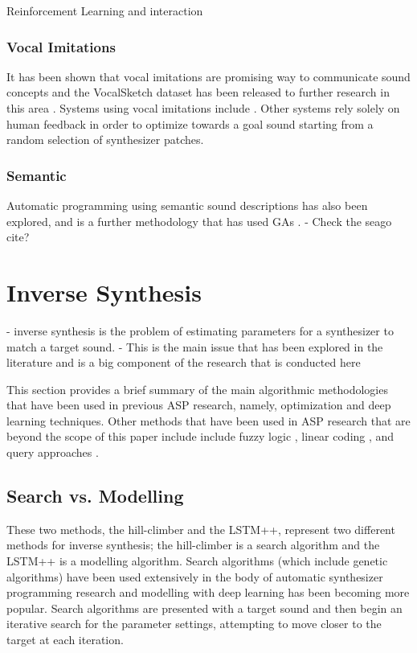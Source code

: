 Reinforcement Learning and interaction \cite{scurto2021designing}

 \subsubsection{Vocal Imitations}
 It has been shown that vocal imitations are promising way to communicate sound concepts \cite{lemaitre2014effectiveness} and the VocalSketch dataset has been released to further research in this area \cite{cartwright2015vocalsketch}. Systems using vocal imitations include \cite{mcartwright2014}\cite{zhang2018visualization}. Other systems rely solely on human feedback in order to optimize towards a goal sound starting from a random selection of synthesizer patches. 
 
 \subsubsection{Semantic}
 Automatic programming using semantic sound descriptions has also been explored, and is a further methodology that has used GAs \cite{krekovic2016algorithm}.
 - Check the seago cite?

\section{Inverse Synthesis}
- inverse synthesis is the problem of estimating parameters for a synthesizer to match a target sound.
- This is the main issue that has been explored in the literature and is a big component of the research that is conducted here
 
This section provides a brief summary of the main algorithmic methodologies that have been used in previous ASP research, namely, optimization and deep learning techniques. Other methods that have been used in ASP research that are beyond the scope of this paper include  include fuzzy logic \cite{mitchell2005frequency, hamadicharef2012intelligent}, linear coding \cite{mintz2007toward}, and query approaches \cite{mcartwright2014}.

\subsection{Search vs. Modelling}
These two methods, the hill-climber and the LSTM++, represent two different methods for inverse synthesis; the hill-climber is a search algorithm and the LSTM++ is a modelling algorithm. Search algorithms (which include genetic algorithms) have been used extensively in the body of automatic synthesizer programming research and modelling with deep learning has been becoming more popular. Search algorithms are presented with a target sound and then begin an iterative search for the parameter settings, attempting to move closer to the target at each iteration.

